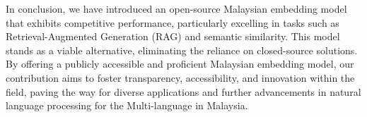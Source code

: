\documentclass[preprint]{article}
\begin{document}
In conclusion, we have introduced an open-source Malaysian embedding model that exhibits competitive performance, particularly excelling in tasks such as Retrieval-Augmented Generation (RAG) and semantic similarity. This model stands as a viable alternative, eliminating the reliance on closed-source solutions. By offering a publicly accessible and proficient Malaysian embedding model, our contribution aims to foster transparency, accessibility, and innovation within the field, paving the way for diverse applications and further advancements in natural language processing for the Multi-language in Malaysia.

{}

\end{document}
